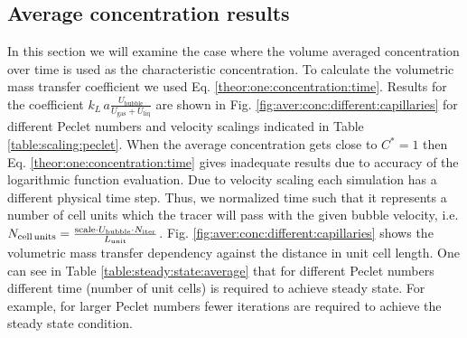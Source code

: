 \documentclass{article}
\newcommand{\beqal}{\begin{equation}\begin{aligned}}
\newcommand{\feqal}{\end{aligned}\end{equation}}
\newcommand{\vol}{k_L\,a}
\newcommand{\lunit}{L_{\mathrm{unit}}}
\newcommand{\ububble}{U_{\mathrm{bubble}}}
\newcommand{\uliq}{U_{\mathrm{liq}}}
\newcommand{\ugas}{U_{\mathrm{gas}}}
\newcommand{\cstar}{C^{*}}
\begin{document}
\subsection{Average concentration results}
\label{main:results:periodic}
In this section we will examine the case where the volume averaged concentration over
 time is used as the characteristic concentration. To calculate the volumetric mass transfer coefficient we used Eq. \ref{theor:one:concentration:time}.
Results for the coefficient $\vol \frac{\ububble}{\ugas+\uliq}$ are shown in Fig.
\ref{fig:aver:conc:different:capillaries} for different Peclet numbers and velocity scalings
indicated in Table \ref{table:scaling:peclet}. When the average concentration gets
close to $\cstar=1$ then Eq. \ref{theor:one:concentration:time} gives inadequate results due to
 accuracy of the logarithmic function evaluation. 
Due to velocity scaling
each simulation has a different physical time step. Thus, we normalized time such that it represents a number of cell
units which the tracer will pass with the given bubble velocity, i.e. 
$N_{\text{cell\,units}}=\frac{\text{scale}\cdot \ububble\cdot N_{\mathrm{iter}}}{\lunit}$.  Fig.
\ref{fig:aver:conc:different:capillaries} shows the volumetric mass transfer
dependency against the distance in unit cell length. One can see in Table
\ref{table:steady:state:average} that for different Peclet numbers different time (number of unit
cells) is required to achieve  steady state. For example, for
larger Peclet numbers fewer iterations are required to achieve the steady state condition. 
\end{document}
